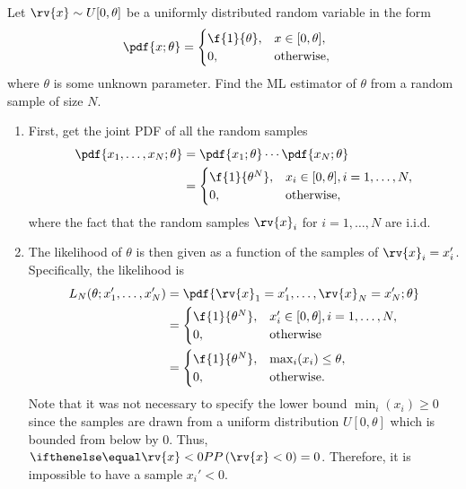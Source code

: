 \begin{example}
    Let $\rv{x}\sim U[0,\theta]$ be a uniformly distributed random variable in the form
    \begin{align}
        \pdf{x; \theta} &= 
        \begin{cases}
            \f{1}{\theta}, &x\in[0,\theta],\\
            0,&\text{otherwise},
        \end{cases}
    \end{align}
    where $\theta$ is some unknown parameter. Find the ML estimator of $\theta$ from a random sample of size $N$.

    \begin{enumerate}
        \item First, get the joint PDF of all the random samples
        \begin{align}
            \pdf{x_{1}, \ldots, x_{N}; \theta} &= \pdf{x_{1};\theta}\cdots\pdf{x_{N}; \theta}\\
            &= 
            \begin{cases}
                \f{1}{\theta^{N}}, &x_{i}\in[0, \theta], i=1,\ldots,N,\\
                0, &\text{otherwise},
            \end{cases}
        \end{align}
        where the fact that the random samples $\rv{x}_{i}$ for $i=1,\ldots,N$ are i.i.d. 

        \item The likelihood of $\theta$ is then given as a function of the samples of $\rv{x}_{i}=x_{i}'$. Specifically, the likelihood is
        \begin{align}
            L_{N}(\theta; x_{1}', \ldots, x_{N}') &=
            \pdf{\rv{x}_{1} = x_{1}', \ldots, \rv{x}_{N} = x_{N}'; \theta}\\
            &=
            \begin{cases}
                \f{1}{\theta^{N}}, &x_{i}'\in[0,\theta], i=1,\ldots, N, \\
                0, &\text{otherwise}
            \end{cases}\\
            &=
            \begin{cases}
                \label{eq:example ML uniform distribution}
                \f{1}{\theta^{N}}, &\max_{i}(x_{i})\leq\theta, \\
                0, &\text{otherwise}.
            \end{cases}
        \end{align}
        Note that it was not necessary to specify the lower bound $\min_{i}(x_{i})\geq 0$ since the samples are drawn from a uniform distribution $U[0, \theta]$ which is bounded from below by $0$. Thus, $\prob{\rv{x}<0} = 0$. Therefore, it is impossible to have a sample $x_{i}'<0$.


\end{enumerate}
\end{example}
